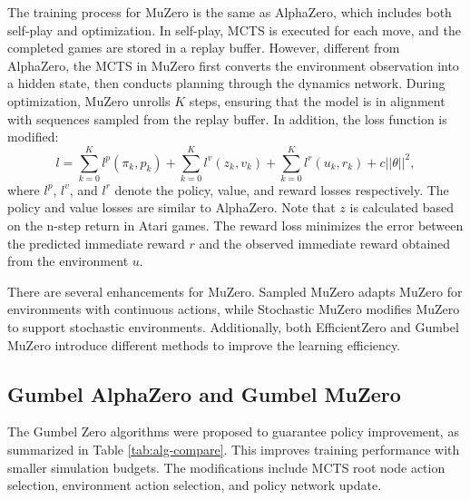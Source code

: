 The training process for MuZero is the same as AlphaZero, which includes both self-play and optimization.
In self-play, MCTS is executed for each move, and the completed games are stored in a replay buffer.
However, different from AlphaZero, the MCTS in MuZero first converts the environment observation into a hidden state, then conducts planning through the dynamics network.
During optimization, MuZero unrolls $K$ steps, ensuring that the model is in alignment with sequences sampled from the replay buffer.
In addition, the loss function is modified:
\begin{equation}\label{eq:mz_loss}
l=\sum_{k=0}^{K}l^{p}(\pi_k,p_k)+\sum_{k=0}^{K}l^{v}(z_k,v_k)+\sum_{k=0}^{K}l^{r}(u_k,r_k)+c||\theta||^{2},
\end{equation}
where $l^p$, $l^v$, and $l^r$ denote the policy, value, and reward losses respectively.
The policy and value losses are similar to AlphaZero.
Note that $z$ is calculated based on the n-step return in Atari games.
The reward loss minimizes the error between the predicted immediate reward $r$ and the observed immediate reward obtained from the environment $u$.

There are several enhancements for MuZero.
Sampled MuZero \cite{hubert_learning_2021} adapts MuZero for environments with continuous actions, while Stochastic MuZero \cite{antonoglou_planning_2021} modifies MuZero to support stochastic environments.
Additionally, both EfficientZero \cite{ye_mastering_2021} and Gumbel MuZero \cite{danihelka_policy_2022} introduce different methods to improve the learning efficiency.

\subsection{Gumbel AlphaZero and Gumbel MuZero}\label{bg:gz}
The Gumbel Zero algorithms \cite{danihelka_policy_2022} were proposed to guarantee policy improvement, as summarized in Table \ref{tab:alg-compare}.
This improves training performance with smaller simulation budgets.
The modifications include MCTS root node action selection, environment action selection, and policy network update.

